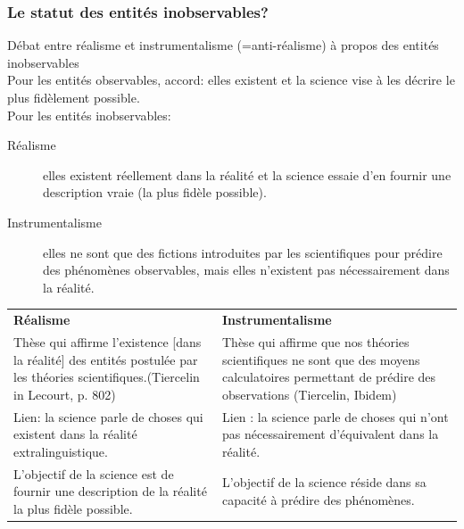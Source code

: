 \documentclass{report}
\begin{document}
	\subsubsection{Le statut des entités inobservables?}
	
	Débat entre réalisme et instrumentalisme (=anti-réalisme) à propos des entités inobservables\\
	Pour les entités observables, accord: elles existent et la science vise à les décrire le plus fidèlement possible.\\
	Pour les entités inobservables:
	\begin{description}
		\item[Réalisme] elles existent réellement dans la réalité et la science essaie d’en fournir une description \og vraie \fg (la plus fidèle possible).
		\item[Instrumentalisme] elles ne sont que des fictions introduites par les scientifiques pour prédire des phénomènes observables, mais elles n’existent pas nécessairement dans la réalité.
	\end{description}
	
	\begin{center}
		\begin{tabular}{|p{}|p{}|}
			\hline \textbf{Réalisme} & \textbf{Instrumentalisme}\\
			\hhline{|=|=|} Thèse qui affirme \og l’existence [dans la réalité] des entités postulée par les théories scientifiques.\fg  (Tiercelin in Lecourt, p. 802) & Thèse qui affirme que \og nos théories scientifiques ne sont que des moyens calculatoires permettant de prédire des observations \fg (Tiercelin, Ibidem) \\
			\hline Lien: la science parle de choses qui existent dans la réalité extralinguistique. &  Lien : la science parle de choses qui n’ont pas nécessairement d’équivalent dans la réalité. \\
			\hline L’objectif de la science est de fournir une description de la réalité la plus fidèle possible. & L’objectif de la science réside dans sa capacité à prédire des phénomènes. \\
			\hline
		\end{tabular}
	\end{center}
	
\end{document}
